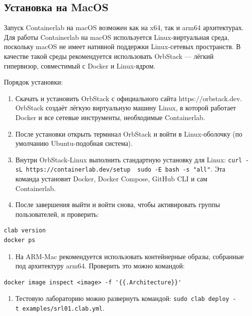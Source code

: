 \documentclass[
  english,
  russian,
  12pt,
  a4paper,
]{phdthesr}
\providecommand{\tightlist}{%
  \setlength{\itemsep}{0pt}\setlength{\parskip}{0pt}}
\begin{document}
\subsection{Установка на
MacOS}\label{ux443ux441ux442ux430ux43dux43eux432ux43aux430-ux43dux430-macos-1}

Запуск Containerlab на macOS возможен как на x64, так и arm64
архитектурах. Для работы Containerlab на macOS используется
Linux-виртуальная среда, поскольку macOS не имеет нативной поддержки
Linux-сетевых пространств. В качестве такой среды рекомендуется
использовать OrbStack --- лёгкий гипервизор, совместимый с Docker и
Linux-ядром.

Порядок установки:

\begin{enumerate}
\def\labelenumi{\arabic{enumi}.}
\tightlist
\item
  Скачать и установить OrbStack с официального сайта
  https://orbstack.dev. OrbStack создаёт лёгкую виртуальную машину
  Linux, в которой работает Docker и все сетевые инструменты,
  необходимые Containerlab.
\item
  После установки открыть терминал OrbStack и войти в Linux-оболочку (по
  умолчанию Ubuntu-подобная система).
\item
  Внутри OrbStack-Linux выполнить стандартную установку для Linux:
  \texttt{curl\ -sL\ https://containerlab.dev/setup\ \textbar{}\ sudo\ -E\ bash\ -s\ "all"}.
  Эта команда установит Docker, Docker Compose, GitHub CLI и сам
  Containerlab.
\item
  После завершения выйти и войти снова, чтобы активировать группы
  пользователей, и проверить:
\end{enumerate}

\begin{verbatim}
clab version
docker ps
\end{verbatim}

\begin{enumerate}
\def\labelenumi{\arabic{enumi}.}
\setcounter{enumi}{4}
\tightlist
\item
  На ARM-Mac рекомендуется использовать контейнерные образы, собранные
  под архитектуру arm64. Проверить это можно командой:
\end{enumerate}

\begin{verbatim}
docker image inspect <image> -f '{{.Architecture}}'
\end{verbatim}

\begin{enumerate}
\def\labelenumi{\arabic{enumi}.}
\setcounter{enumi}{5}
\tightlist
\item
  Тестовую лабораторию можно развернуть командой:
  \texttt{sudo\ clab\ deploy\ -t\ examples/srl01.clab.yml}.
\end{enumerate}
\end{document}
